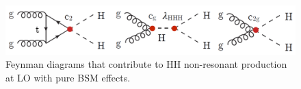 
\begin{figure}[ht]
	\centering
	\includegraphics[width=\textwidth]{MSc_Thesis/fig/resonantHH.png}
	\vspace{2mm}
	\caption[Feynman diagrams that contribute to HH non-resonant production at LO with pure BSM effects.]
	{Feynman diagrams that contribute to HH non-resonant production at LO with pure BSM effects.}
	\label{resonantHH}
\end{figure}


\newpage